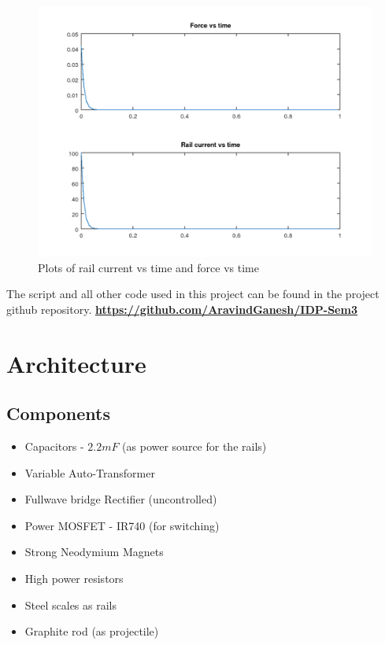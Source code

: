 \documentclass[twocolumn]{article}
\begin{document}
\begin{figure}[h]
	\caption{Plots of rail current vs time and force vs time}
	\includegraphics[width=\linewidth]{plots.png}
\end{figure}
		The script and all other code used in this project can be found in the project github repository.
\href{https://github.com/AravindGanesh/IDP-Sem3}{\textbf{https://github.com/AravindGanesh/IDP-Sem3}}




\section{Architecture}
\subsection*{Components}
\begin{itemize}
\item Capacitors - $2.2mF$  (as power source for the rails)
\item Variable Auto-Transformer 
\item Fullwave bridge Rectifier (uncontrolled)
\item Power MOSFET - IR740 (for switching)
\item Strong Neodymium Magnets
\item High power resistors
\item Steel scales as rails
\item Graphite rod (as projectile)
\end{itemize}
\end{document}
